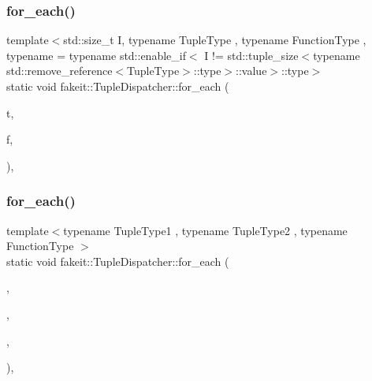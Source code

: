 \mbox{\label{structfakeit_1_1TupleDispatcher_afd32e025fbf695e16bb4b4ac1642c491}} 
\subsubsection{\texorpdfstring{for\_each()}{for\_each()}\hspace{0.1cm}{\footnotesize\ttfamily [30/54]}}
{\footnotesize\ttfamily template$<$std\+::size\+\_\+t I, typename Tuple\+Type , typename Function\+Type , typename  = typename std\+::enable\+\_\+if$<$            I != std\+::tuple\+\_\+size$<$typename std\+::remove\+\_\+reference$<$\+Tuple\+Type$>$\+::type$>$\+::value$>$\+::type$>$ \\
static void fakeit\+::\+Tuple\+Dispatcher\+::for\+\_\+each (\begin{DoxyParamCaption}\item[{Tuple\+Type \&\&}]{t,  }\item[{Function\+Type \&}]{f,  }\item[{std\+::integral\+\_\+constant$<$ size\+\_\+t, I $>$}]{ }\end{DoxyParamCaption})\hspace{0.3cm}{\ttfamily [inline]}, {\ttfamily [static]}}

\mbox{\label{structfakeit_1_1TupleDispatcher_a30fb1a59df83f4faaa461d3fee4b20bc}} 
\subsubsection{\texorpdfstring{for\_each()}{for\_each()}\hspace{0.1cm}{\footnotesize\ttfamily [31/54]}}
{\footnotesize\ttfamily template$<$typename Tuple\+Type1 , typename Tuple\+Type2 , typename Function\+Type $>$ \\
static void fakeit\+::\+Tuple\+Dispatcher\+::for\+\_\+each (\begin{DoxyParamCaption}\item[{Tuple\+Type1 \&\&}]{,  }\item[{Tuple\+Type2 \&\&}]{,  }\item[{Function\+Type \&}]{,  }\item[{std\+::integral\+\_\+constant$<$ size\+\_\+t, std\+::tuple\+\_\+size$<$ typename std\+::remove\+\_\+reference$<$ Tuple\+Type1 $>$\+::type $>$\+::value $>$}]{ }\end{DoxyParamCaption})\hspace{0.3cm}{\ttfamily [inline]}, {\ttfamily [static]}}

